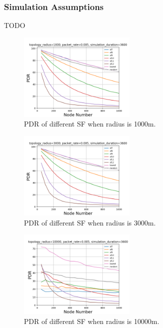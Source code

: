 \documentclass[conference]{IEEEtran}
\begin{document}
\subsubsection{Simulation Assumptions}
TODO

\begin{figure}
\centering
\includegraphics[width=0.5\textwidth]{sf_1000}
\caption{PDR of different SF when radius is 1000m.}
\label{fig:sf_1000}
\end{figure}

\begin{figure}
\centering
\includegraphics[width=0.5\textwidth]{sf_3000}
\caption{PDR of different SF when radius is 3000m.}
\label{fig:sf_3000}
\end{figure}

\begin{figure}
\centering
\includegraphics[width=0.5\textwidth]{sf_10000}
\caption{PDR of different SF when radius is 10000m.}
\label{fig:sf_10000}
\end{figure}
\end{document}
